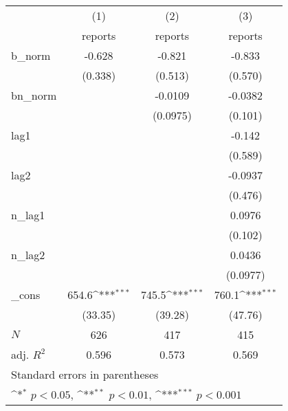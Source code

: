 {
\def\sym#1{\ifmmode^{#1}\else\(^{#1}\)\fi}
\begin{tabular}{l*{3}{c}}
\hline\hline
            &\multicolumn{1}{c}{(1)}&\multicolumn{1}{c}{(2)}&\multicolumn{1}{c}{(3)}\\
            &\multicolumn{1}{c}{reports}&\multicolumn{1}{c}{reports}&\multicolumn{1}{c}{reports}\\
\hline
b\_norm      &      -0.628         &      -0.821         &      -0.833         \\
            &     (0.338)         &     (0.513)         &     (0.570)         \\
[1em]
bn\_norm     &                     &     -0.0109         &     -0.0382         \\
            &                     &    (0.0975)         &     (0.101)         \\
[1em]
lag1        &                     &                     &      -0.142         \\
            &                     &                     &     (0.589)         \\
[1em]
lag2        &                     &                     &     -0.0937         \\
            &                     &                     &     (0.476)         \\
[1em]
n\_lag1      &                     &                     &      0.0976         \\
            &                     &                     &     (0.102)         \\
[1em]
n\_lag2      &                     &                     &      0.0436         \\
            &                     &                     &    (0.0977)         \\
[1em]
\_cons      &       654.6\sym{***}&       745.5\sym{***}&       760.1\sym{***}\\
            &     (33.35)         &     (39.28)         &     (47.76)         \\
\hline
\(N\)       &         626         &         417         &         415         \\
adj. \(R^{2}\)&       0.596         &       0.573         &       0.569         \\
\hline\hline
\multicolumn{4}{l}{\footnotesize Standard errors in parentheses}\\
\multicolumn{4}{l}{\footnotesize \sym{*} \(p<0.05\), \sym{**} \(p<0.01\), \sym{***} \(p<0.001\)}\\
\end{tabular}
}
